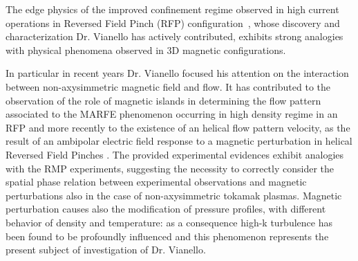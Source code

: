 \documentclass[12pt,a4paper]{article}
\begin{document}
The edge physics of the improved confinement regime observed in
high current operations in Reversed Field Pinch (RFP)
configuration~\cite{Lorenzini:2009p4248}, whose discovery and
characterization Dr. Vianello has actively contributed, exhibits strong
analogies with physical phenomena observed in 3D magnetic
configurations.

In particular in recent years Dr. Vianello focused his attention on
the interaction between non-axysimmetric magnetic field and flow. It
has contributed to the observation of the role of magnetic islands in
determining the flow pattern associated to the MARFE phenomenon
\cite{Spizzo:2012hw,Spizzo:2010p4796} occurring in high density regime
in an RFP and more recently to the existence of an helical flow
pattern velocity, as the result of an ambipolar electric field
response to a magnetic perturbation in helical Reversed Field Pinches
\cite{Vianello:2012uh}. The  provided experimental evidences exhibit
analogies with the RMP experiments,
suggesting the necessity to correctly consider the spatial phase
relation between experimental observations and magnetic perturbations
also in the case of non-axysimmetric tokamak plasmas. Magnetic
perturbation causes also the modification of pressure profiles, with
different behavior of density and temperature: as a consequence high-k
turbulence has been found to be profoundly influenced
\cite{0741-3335-54-6-065003} and this phenomenon represents the
present subject of investigation of Dr. Vianello.

\printbibliography[title=Personal publications,notkeyword=others]
\printbibliography[title=Other Sources, keyword=others]
\end{document}
